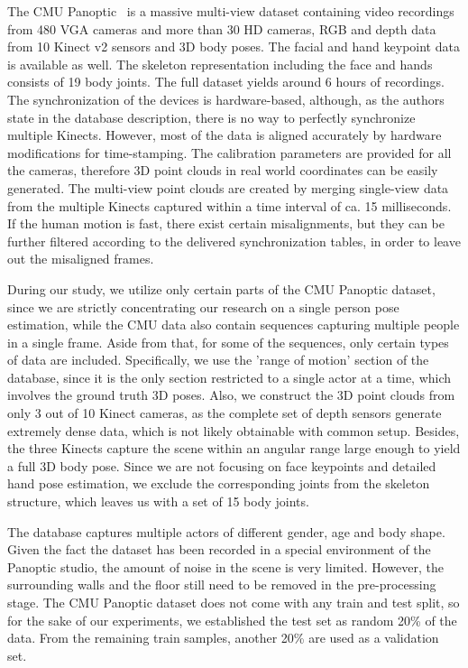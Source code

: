 The CMU Panoptic~\cite{Joo_2017_TPAMI} is a massive multi-view dataset containing video recordings from 480 VGA cameras and more than 30 HD cameras, RGB and depth data from 10 Kinect v2 sensors and 3D body poses. The facial and hand keypoint data is available as well. The skeleton representation including the face and hands consists of 19 body joints. The full dataset yields around 6 hours of recordings. The synchronization of the devices is hardware-based, although, as the authors state in the database description, there is no way to perfectly synchronize multiple Kinects. However, most of the data is aligned accurately by hardware modifications for time-stamping. The calibration parameters are provided for all the cameras, therefore 3D point clouds in real world coordinates can be easily generated. The multi-view point clouds are created by merging single-view data from the multiple Kinects captured within a time interval of ca. 15 milliseconds. If the human motion is fast, there exist certain misalignments, but they can be further filtered according to the delivered synchronization tables, in order to leave out the misaligned frames.\par
\vspace{5mm}
\noindent
During our study, we utilize only certain parts of the CMU Panoptic dataset, since we are strictly concentrating our research on a single person pose estimation, while the CMU data also contain sequences capturing multiple people in a single frame. Aside from that, for some of the sequences, only certain types of data are included. Specifically, we use the 'range of motion' section of the database, since it is the only section restricted to a single actor at a time, which involves the ground truth 3D poses. Also, we construct the 3D point clouds from only 3 out of 10 Kinect cameras, as the complete set of depth sensors generate extremely dense data, which is not likely obtainable with common setup. Besides, the three Kinects capture the scene within an angular range large enough to yield a full 3D body pose. Since we are not focusing on face keypoints and detailed hand pose estimation, we exclude the corresponding joints from the skeleton structure, which leaves us with a set of 15 body joints.\par
\vspace{5mm}
\noindent The database captures multiple actors of different gender, age and body shape. Given the fact the dataset has been recorded in a special environment of the Panoptic studio, the amount of noise in the scene is very limited. However, the surrounding walls and the floor still need to be removed in the pre-processing stage. The CMU Panoptic dataset does not come with any train and test split, so for the sake of our experiments, we established the test set as random 20\% of the data. From the remaining train samples, another 20\% are used as a validation set.



